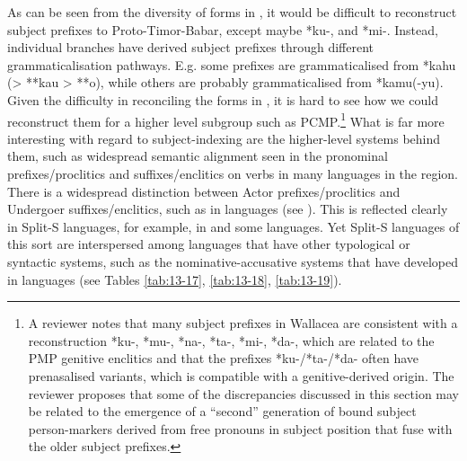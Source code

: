 As can be seen from the diversity of forms in ,
it would be difficult to reconstruct subject prefixes to Proto-Timor-Babar,
except maybe  *ku-, and  *mi-.
Instead, individual branches have derived subject prefixes through
different grammaticalisation pathways. E.g.
some  prefixes are grammaticalised from *kahu (> **kau
> **o), while others are probably grammaticalised from  *kamu(-yu).
Given the difficulty in reconciling the forms in ,
it is hard to see how we could reconstruct them for a higher
level subgroup such as PCMP.\footnote{
		A reviewer notes that many
		subject prefixes in Wallacea are consistent with a reconstruction
		 *ku-,  *mu-,  *na-,
		 *ta-,  *mi-,
		 *da-, which are related to the PMP genitive enclitics
		and that the prefixes *ku-/*ta-/*da- often
		have prenasalised variants, which is compatible with a genitive-derived origin.
		The reviewer proposes that some of the discrepancies
		discussed in this section may be related to the emergence of
		a “second” generation of bound subject person-markers derived
		from free pronouns in subject position that fuse with the older subject prefixes.}
What is far more interesting with regard to subject-indexing
are the higher-level systems behind them,
such as widespread semantic alignment seen in the pronominal
prefixes/proclitics and suffixes/enclitics on verbs in many languages in the region.
There is a widespread distinction between Actor prefixes/proclitics
and Undergoer suffixes/enclitics, such as in  languages (see ).
This is reflected clearly in Split-S languages,
for example, in 
and some  languages.
Yet Split-S languages of this sort are interspersed among languages
that have other typological or syntactic systems,
such as the nominative-accusative systems that have developed
in  languages (see Tables \ref{tab:13-17}, \ref{tab:13-18}, \ref{tab:13-19}).

